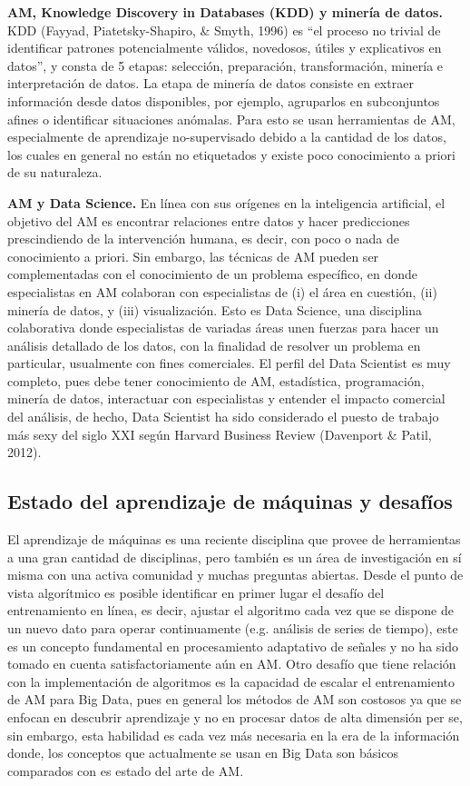\textbf{AM, Knowledge Discovery in Databases (KDD) y minería de datos.} KDD (Fayyad, Piatetsky-Shapiro, \& Smyth, 1996) es “el proceso no trivial de identificar patrones potencialmente válidos, novedosos, útiles y explicativos en datos”, y consta de 5 etapas: selección, preparación, transformación, minería e interpretación de datos. La etapa de minería de datos  consiste en extraer información desde datos disponibles, por ejemplo, agruparlos en subconjuntos afines o identificar situaciones anómalas. Para esto se usan herramientas de AM, especialmente de aprendizaje no-supervisado debido a la cantidad de los datos, los cuales en general no están no etiquetados y existe poco conocimiento a priori de su naturaleza. 

\textbf{AM y Data Science.} En línea con sus orígenes en la inteligencia artificial, el objetivo del AM es encontrar relaciones entre datos y hacer predicciones prescindiendo de la intervención humana, es decir, con poco o nada de conocimiento a priori. Sin embargo, las técnicas de AM pueden ser complementadas con el conocimiento de un problema específico, en donde especialistas en AM colaboran con especialistas de (i) el área en cuestión, (ii) minería de datos, y (iii) visualización. Esto es Data Science, una disciplina colaborativa donde especialistas de variadas áreas unen fuerzas para hacer un análisis detallado de los datos, con la finalidad de resolver un problema en particular, usualmente con fines comerciales. El perfil del Data Scientist es muy completo, pues debe tener conocimiento de AM, estadística, programación, minería de datos, interactuar con especialistas y entender el impacto comercial del análisis, de hecho, Data Scientist ha sido considerado el puesto de trabajo más sexy del siglo XXI según Harvard Business Review (Davenport \& Patil, 2012).
\\

\subsection{Estado del aprendizaje de máquinas y desafíos}

El aprendizaje de máquinas es una reciente disciplina que provee de herramientas a una gran cantidad de disciplinas, pero también es un área de investigación en sí misma con una activa comunidad y muchas preguntas abiertas. Desde el punto de vista algorítmico es posible identificar en primer lugar el desafío del entrenamiento en línea, es decir, ajustar el algoritmo cada vez que se dispone de un nuevo dato para operar continuamente (e.g. análisis de series de tiempo), este es un concepto fundamental en procesamiento adaptativo de señales y no ha sido tomado en cuenta satisfactoriamente aún en AM. Otro desafío que tiene relación con la implementación de algoritmos es la capacidad de escalar el entrenamiento de AM para Big Data,  pues en general los métodos de AM son costosos ya que se enfocan en descubrir aprendizaje y no en procesar datos de alta dimensión per se, sin embargo, esta habilidad es cada vez más necesaria en la era de la información donde, los conceptos que actualmente se usan en Big Data son básicos comparados con es estado del arte de AM.

